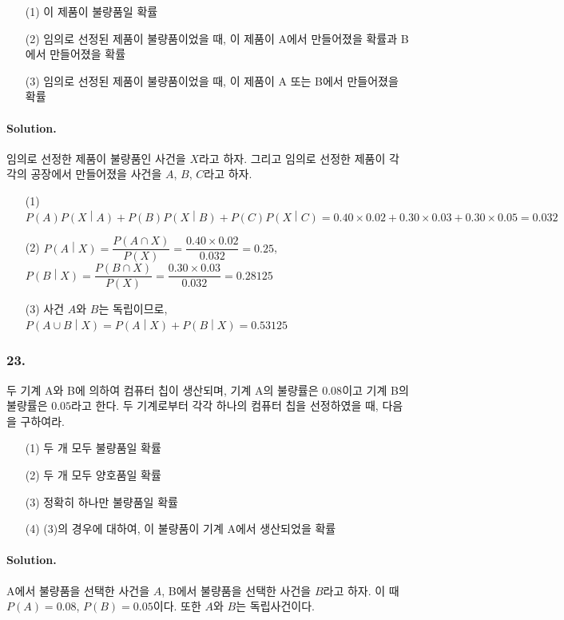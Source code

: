 \begin{itemize}
	\item[(1)] 이 제품이 불량품일 확률
	\item[(2)] 임의로 선정된 제품이 불량품이었을 때, 이 제품이 A에서 만들어졌을 확률과 B에서 만들어졌을 확률
	\item[(3)] 임의로 선정된 제품이 불량품이었을 때, 이 제품이 A 또는 B에서 만들어졌을 확률
\end{itemize}

\paragraph{Solution.} 임의로 선정한 제품이 불량품인 사건을 $X$라고 하자. 그리고 임의로 선정한 제품이 각각의 공장에서 만들어졌을 사건을 $A$, $B$, $C$라고 하자.
\begin{itemize}
	\item[(1)] $P\left(A\right)P\left(X\middle|A\right) + P\left(B\right)P\left(X\middle|B\right) + P\left(C\right)P\left(X\middle|C\right) = 0.40\times0.02+0.30\times0.03+0.30\times0.05=0.032$
	\item[(2)] $P\left(A\middle|X\right) = \dfrac{P\left(A\cap X\right)}{P\left(X\right)} = \dfrac{0.40\times 0.02}{0.032} = 0.25$, $P\left(B\middle|X\right) = \dfrac{P\left(B\cap X\right)}{P\left(X\right)} = \dfrac{0.30\times 0.03}{0.032} = 0.28125$
	\item[(3)] 사건 $A$와 $B$는 독립이므로, $P\left(A\cup B\middle|X\right) = P\left(A\middle|X\right)+P\left(B\middle|X\right) = 0.53125$
\end{itemize}

\subsubsection{23.} 두 기계 A와 B에 의하여 컴퓨터 칩이 생산되며, 기계 A의 불량률은 $0.08$이고 기계 B의 불량률은 $0.05$라고 한다. 두 기계로부터 각각 하나의 컴퓨터 칩을 선정하였을 때, 다음을 구하여라.

\begin{itemize}
	\item[(1)] 두 개 모두 불량품일 확률
	\item[(2)] 두 개 모두 양호품일 확률
	\item[(3)] 정확히 하나만 불량품일 확률
	\item[(4)] (3)의 경우에 대하여, 이 불량품이 기계 A에서 생산되었을 확률
\end{itemize}

\paragraph{Solution.} A에서 불량품을 선택한 사건을 $A$, B에서 불량품을 선택한 사건을 $B$라고 하자. 이 때 $P\left(A\right) = 0.08$, $P\left(B\right) = 0.05$이다. 또한 $A$와 $B$는 독립사건이다.

